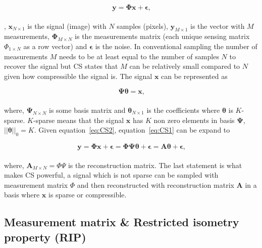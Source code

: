 \begin{equation}
\label{eq:CS1}
   \mathbf{ y = \Phi x + \epsilon}\text{,}
\end{equation}\\[0.1in]


, $\mathbf{x}_{N\times1}$ is the signal (image) with $N$ samples (pixels), $\mathbf{y}_{M\times1}$ is the vector with $M$ measurements, $\mathbf{\Phi}_{M \times N}$ is the measurements matrix (each unique sensing matrix $\Phi_{1 \times N}$ as a row vector) and $\mathbf{\epsilon}$ is the noise. In conventional sampling the number of measurements $M$ needs to be at least equal to the number of samples $N$ to recover the signal but CS states that $M$ can be relatively small compared to $N$ given how compressible the signal is. The signal $\mathbf{x}$ can be represented as  

\begin{equation}
\label{eq:CS2}
   \mathbf{ \Psi \theta = x }\text{,}
\end{equation}\\[0.1in]

where, $\mathbf{\Psi}_{N \times N}$ is some  basis matrix and
$\mathbf{\theta}_{N\times1}$ is the coefficients where $\mathbf{\theta}$ is $K$-sparse. $K$-sparse means that the signal $\mathbf{x}$ has $K$ non zero elements in basis $\mathbf{\Psi}$, $||\mathbf{\theta}||_0 = K$. Given equation~\ref{eq:CS2}, equation~\ref{eq:CS1} can be expand to


\begin{equation}
   \mathbf{ y = \Phi x + \epsilon = \Phi \Psi \theta + \epsilon = A \theta + \epsilon }\text{,}
\end{equation}\\[0.1in]

where, $\textbf{A}_{M \times N} = \Phi \Psi$ is the reconstruction matrix. The last statement is what makes CS powerful, a signal which is not sparse can be sampled with measurement matrix $\Phi$ and then reconstructed with reconstruction matrix $\textbf{A}$ in a basis where $\textbf{x}$ is sparse or compressible. \cite{book:sm}


\subsection{Measurement matrix \& Restricted isometry property (RIP)}

